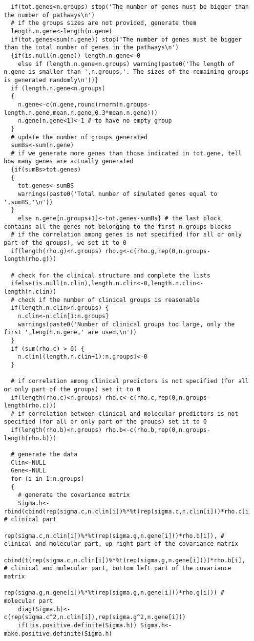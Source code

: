 \begin{lstlisting}
  if(tot.genes<n.groups) stop('The number of genes must be bigger than the number of pathways\n')
  # if the groups sizes are not provided, generate them
  length.n.gene<-length(n.gene)
  if(tot.genes<sum(n.gene)) stop('The number of genes must be bigger than the total number of genes in the pathways\n')
  {if(is.null(n.gene)) length.n.gene<-0
    else if (length.n.gene<n.groups) warning(paste0('The length of n.gene is smaller than ',n.groups,'. The sizes of the remaining groups is generated randomly\n'))}
  if (length.n.gene<n.groups)
  {
    n.gene<-c(n.gene,round(rnorm(n.groups-length.n.gene,mean.n.gene,0.3*mean.n.gene)))
    n.gene[n.gene<1]<-1 # to have no empty group
  }
  # update the number of groups generated
  sumBs<-sum(n.gene)
  # if we generate more genes than those indicated in tot.gene, tell how many genes are actually generated
  {if(sumBs>tot.genes)
  {
    tot.genes<-sumBS
    warnings(paste0('Total number of simulated genes equal to ',sumBS,'\n'))
  }
    else n.gene[n.groups+1]<-tot.genes-sumBs} # the last block contains all the genes not belonging to the first n.groups blocks
  # if the correlation among genes is not specified (for all or only part of the groups), we set it to 0
  if(length(rho.g)<n.groups) rho.g<-c(rho.g,rep(0,n.groups-length(rho.g)))

  # check for the clinical structure and complete the lists
  ifelse(is.null(n.clin),length.n.clin<-0,length.n.clin<-length(n.clin))
  # check if the number of clinical groups is reasonable
  if(length.n.clin>n.groups) {
    n.clin<-n.clin[1:n.groups]
    warnings(paste0('Number of clinical groups too large, only the first ',length.n.gene,' are used.\n'))
  }
  if (sum(rho.c) > 0) {
    n.clin[(length.n.clin+1):n.groups]<-0
  }

  # if correlation among clinical predictors is not specified (for all or only part of the groups) set it to 0
  if(length(rho.c)<n.groups) rho.c<-c(rho.c,rep(0,n.groups-length(rho.c)))
  # if correlation between clinical and molecular predictors is not specified (for all or only part of the groups) set it to 0
  if(length(rho.b)<n.groups) rho.b<-c(rho.b,rep(0,n.groups-length(rho.b)))

  # generate the data
  Clin<-NULL
  Gene<-NULL
  for (i in 1:n.groups)
  {
    # generate the covariance matrix
    Sigma.h<-rbind(cbind(rep(sigma.c,n.clin[i])%*%t(rep(sigma.c,n.clin[i]))*rho.c[i], # clinical part
                         rep(sigma.c,n.clin[i])%*%t(rep(sigma.g,n.gene[i]))*rho.b[i]), # clinical and molecular part, up right part of the covariance matrix
                   cbind(t(rep(sigma.c,n.clin[i])%*%t(rep(sigma.g,n.gene[i])))*rho.b[i], # clinical and molecular part, bottom left part of the covariance matrix
                         rep(sigma.g,n.gene[i])%*%t(rep(sigma.g,n.gene[i]))*rho.g[i])) # molecular part
    diag(Sigma.h)<-c(rep(sigma.c^2,n.clin[i]),rep(sigma.g^2,n.gene[i]))
    if(!is.positive.definite(Sigma.h)) Sigma.h<-make.positive.definite(Sigma.h)


\end{lstlisting}
